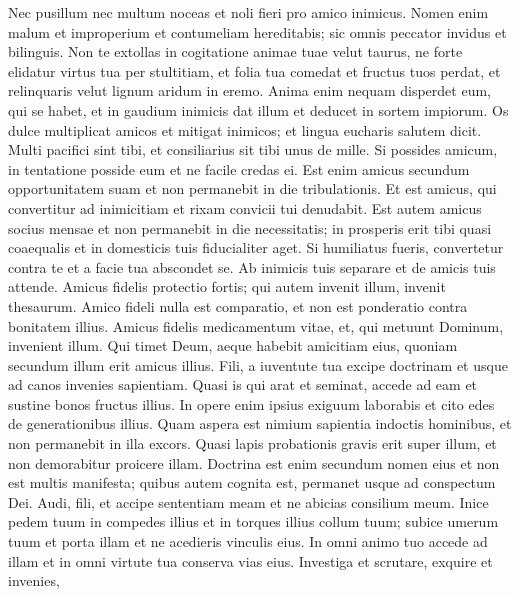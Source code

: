 \begin{biblechapter}
\begin{biblechapter}
\begin{biblechapter}
\begin{biblechapter}
\begin{biblechapter}
\begin{biblechapter}
\verse Nec pusillum nec multum noceas
 et noli fieri pro amico inimicus.
 Nomen enim malum et improperium et contumeliam hereditabis;
 sic omnis peccator invidus et bilinguis.
 \verse Non te extollas in cogitatione animae tuae velut taurus,
 ne forte elidatur virtus tua per stultitiam,
 \verse et folia tua comedat et fructus tuos perdat,
 et relinquaris velut lignum aridum in eremo.
 \verse Anima enim nequam disperdet eum, qui se habet,
 et in gaudium inimicis dat illum
 et deducet in sortem impiorum.
 \verse Os dulce multiplicat amicos et mitigat inimicos;
 et lingua eucharis salutem dicit.
 \verse Multi pacifici sint tibi,
 et consiliarius sit tibi unus de mille.
 \verse Si possides amicum, in tentatione posside eum
 et ne facile credas ei.
 \verse Est enim amicus secundum opportunitatem suam
 et non permanebit in die tribulationis.
 \verse Et est amicus, qui convertitur ad inimicitiam
 et rixam convicii tui denudabit.
 \verse Est autem amicus socius mensae
 et non permanebit in die necessitatis;
 \verse in prosperis erit tibi quasi coaequalis
 et in domesticis tuis fiducialiter aget.
 \verse Si humiliatus fueris, convertetur contra te
 et a facie tua abscondet se.
 \verse Ab inimicis tuis separare
 et de amicis tuis attende.
 \verse Amicus fidelis protectio fortis;
 qui autem invenit illum, invenit thesaurum.
 \verse Amico fideli nulla est comparatio,
 et non est ponderatio contra bonitatem illius.
 \verse Amicus fidelis medicamentum vitae,
 et, qui metuunt Dominum, invenient illum.
 \verse Qui timet Deum, aeque habebit amicitiam eius,
 quoniam secundum illum erit amicus illius.
 \verse Fili, a iuventute tua excipe doctrinam
 et usque ad canos invenies sapientiam.
 \verse Quasi is qui arat et seminat, accede ad eam
 et sustine bonos fructus illius.
 \verse In opere enim ipsius exiguum laborabis
 et cito edes de generationibus illius.
 \verse Quam aspera est nimium sapientia indoctis hominibus,
 et non permanebit in illa excors.
 \verse Quasi lapis probationis gravis erit super illum,
 et non demorabitur proicere illam.
 \verse Doctrina est enim secundum nomen eius
 et non est multis manifesta;
 quibus autem cognita est, permanet usque ad conspectum Dei.
 \verse Audi, fili, et accipe sententiam meam
 et ne abicias consilium meum.
 \verse Inice pedem tuum in compedes illius
 et in torques illius collum tuum;
 \verse subice umerum tuum et porta illam
 et ne acedieris vinculis eius.
 \verse In omni animo tuo accede ad illam
 et in omni virtute tua conserva vias eius.
 \verse Investiga et scrutare, exquire et invenies,

\end{biblechapter}
\end{biblechapter}
\end{biblechapter}
\end{biblechapter}
\end{biblechapter}
\end{biblechapter}
